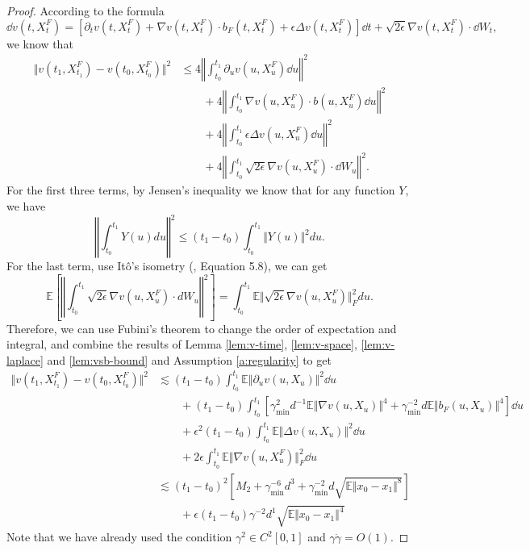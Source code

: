 \begin{proof}
    According to the formula 
    $$\dd v(t,X_t^F)=[\partial_tv(t,X_t^F)+\nabla v(t,X_t^F)\cdot b_F(t,X_t^F)+\epsilon\Delta v(t,X_t^F)]\dd t+\sqrt{2\epsilon}\nabla v(t,X_t^F)\cdot \dd W_t,$$
    we know that 
    $$\begin{aligned}
        \Vert v(t_1,X_{t_1}^F)-v(t_0,X_{t_0}^F)\Vert^2
        &\le4\left\Vert\int_{t_0}^{t_1}\partial_uv(u,X_u^F)\dd u\right\Vert^2\\
        &\qquad+4\left\Vert\int_{t_0}^{t_1}\nabla v(u,X_u^F)\cdot b(u,X_u^F)\dd u\right\Vert^2\\
        &\qquad+4\left\Vert\int_{t_0}^{t_1}\epsilon\Delta v(u,X_u^F)\dd u\right\Vert^2\\
        &\qquad+4\left\Vert\int_{t_0}^{t_1}\sqrt{2\epsilon}\nabla v(u,X_u^F)\cdot \dd W_u\right\Vert^2.
    \end{aligned}$$
    For the first three terms, by Jensen's inequality we know that for any function $Y$, we have $$\left\Vert\int_{t_0}^{t_1}Y(u)du\right\Vert^2\le(t_1-t_0)\int_{t_0}^{t_1}\Vert Y(u)\Vert^2du.$$
    For the last term, use It\^o's isometry (\citealt{le2016brownian}, Equation 5.8), we can get $$\mathbb{E}\left[\left\Vert\int_{t_0}^{t_1}\sqrt{2\epsilon}\nabla v(u,X_u^F)\cdot dW_u\right\Vert^2\right]=\int_{t_0}^{t_1}\mathbb{E}\Vert\sqrt{2\epsilon}\nabla v(u,X_u^F)\Vert_F^2du.$$
    Therefore, we can use Fubini's theorem to change the order of expectation and integral, and combine the results of Lemma \ref{lem:v-time}, \ref{lem:v-space}, \ref{lem:v-laplace} and \ref{lem:vsb-bound} and Assumption \ref{a:regularity} to get
    $$\begin{aligned}
        \Vert v(t_1,X_{t_1}^F)-v(t_0,X_{t_0}^F)\Vert^2&\lesssim(t_1-t_0)\int_{t_0}^{t_1}\mathbb{E}\Vert\partial_uv(u,X_u)\Vert^2\dd u\\
        &\qquad+(t_1-t_0)\int_{t_0}^{t_1}\left[\gamma_{\min}^2d^{-1}\mathbb{E}\Vert\nabla v(u,X_u)\Vert^4+\gamma_{\min}^{-2}d\mathbb{E}\Vert b_F(u,X_u)\Vert^4\right]\dd u\\
        &\qquad+\epsilon^2(t_1-t_0)\int_{t_0}^{t_1}\mathbb{E}\Vert\Delta v(u,X_u)\Vert^2\dd u\\
        &\qquad+2\epsilon\int_{t_0}^{t_1}\mathbb{E}\Vert\nabla v(u,X_u^F)\Vert_F^2\dd u\\
        &\lesssim(t_1-t_0)^2\left[M_2+\gamma_{\min}^{-6}d^3+\gamma_{\min}^{-2}d\sqrt{\mathbb{E}\Vert x_0-x_1\Vert^{8}}\right]\\
        &\qquad+\epsilon(t_1-t_0)\gamma^{-2}d^{1}\sqrt{\mathbb{E}\Vert x_0-x_1\Vert^{4}}
    \end{aligned}$$
    Note that we have already used the condition $\gamma^2\in C^2[0,1]$ and $\gamma\dot{\gamma}=O(1)$.


\end{proof}

